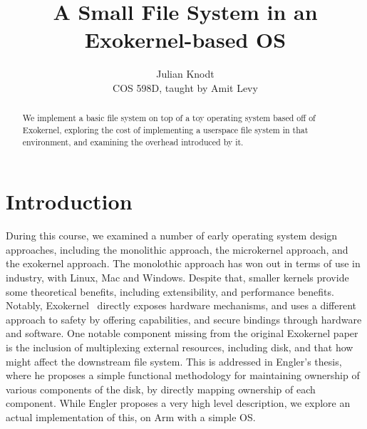 \documentclass[letterpaper,twocolumn,10pt]{article}
\begin{document}

\title{A Small File System in an Exokernel-based OS}

\author{
  {\rm Julian Knodt} \\
  {\rm COS 598D, taught by Amit Levy}
}

\date{}
\maketitle

\begin{abstract}
We implement a basic file system on top of a toy operating system based off of Exokernel,
exploring the cost of implementing a userspace file system in that environment, and examining
the overhead introduced by it.
\end{abstract}


\section{Introduction}

During this course, we examined a number of early operating system design approaches, including
the monolithic approach, the microkernel approach, and the exokernel approach. The monolothic
approach has won out in terms of use in industry, with Linux, Mac and Windows. Despite that,
smaller kernels provide some theoretical benefits, including extensibility, and performance
benefits. Notably, Exokernel~\cite{exokernel} directly exposes hardware mechanisms, and uses a
different approach to safety by offering capabilities, and secure bindings through hardware and
software. One notable component missing from the original Exokernel paper is the inclusion of
multiplexing external resources, including disk, and that how might affect the downstream
file system. This is addressed in Engler's thesis, where he proposes a simple functional
methodology for maintaining ownership of various components of the disk, by directly mapping
ownership of each component. While Engler proposes a very high level description, we explore an
actual implementation of this, on Arm with a simple OS.
\end{document}
